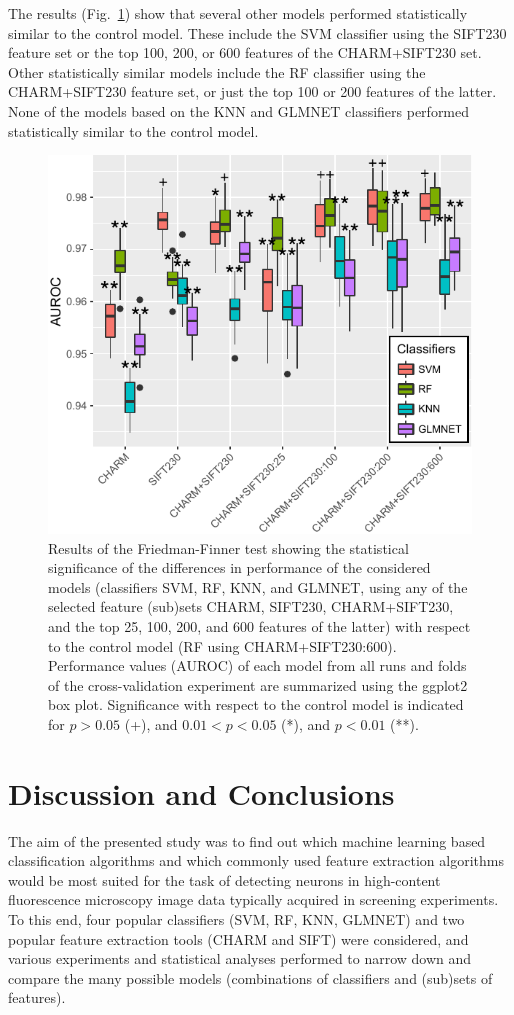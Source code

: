The results (Fig.~\ref{ch5_fig10}) show that several other models performed statistically similar to the control model. These include the SVM classifier using the SIFT230 feature set or the top 100, 200, or 600 features of the CHARM+SIFT230 set. Other statistically similar models include the RF classifier using the CHARM+SIFT230 feature set, or just the top 100 or 200 features of the latter. None of the models based on the KNN and GLMNET classifiers performed statistically similar to the control model.
\begin{figure}[ht]
	\centering
	\includegraphics[width=0.7\columnwidth]{fig10}
	\caption{Results of the Friedman-Finner test showing the statistical significance of the differences in performance of the considered models (classifiers SVM, RF, KNN, and GLMNET, using any of the selected feature (sub)sets CHARM, SIFT230, CHARM+SIFT230, and the top 25, 100, 200, and 600 features of the latter) with respect to the control model (RF using CHARM+SIFT230:600). Performance values (AUROC) of each model from all runs and folds of the cross-validation experiment are summarized using the ggplot2 box plot. Significance with respect to the control model is indicated for $p > 0.05$ (+), and $0.01 < p < 0.05$ (*), and $p < 0.01$ (**).}
	\label{ch5_fig10}
\end{figure}
\section{Discussion and Conclusions}
\label{sec:discussion}
The aim of the presented study was to find out which machine learning based classification algorithms and which commonly used feature extraction algorithms would be most suited for the task of detecting neurons in high-content fluorescence microscopy image data typically acquired in screening experiments. To this end, four popular classifiers (SVM, RF, KNN, GLMNET) and two popular feature extraction tools (CHARM and SIFT) were considered, and various experiments and statistical analyses performed to narrow down and compare the many possible models (combinations of classifiers and (sub)sets of features).

